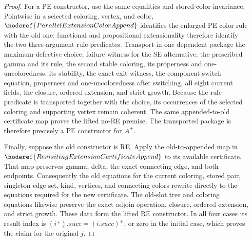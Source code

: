 \begin{proof}
For a PE constructor, use the same equalities and stored-color invariance.
Pointwise in a selected coloring, vertex, and color,
\(\noderef{ParallelExtensionColorAppend}\) identifies the enlarged PE color
rule with the old one; functional and propositional extensionality therefore
identify the two three-argument rule predicates.  Transport in one dependent
package the maximum-defective choice, failure witness for the SE alternative,
the prescribed gamma and its rule, the second stable coloring, its properness
and one-uncoloredness, its stability, the exact exit witness, the component
switch equation, properness and one-uncoloredness after switching, all eight
current fields, the closure, ordered extension, and strict growth.  Because
the rule predicate is transported together with the choice, its occurrences
of the selected coloring and supporting vertex remain coherent.  The same
appended-to-old certificate map proves the lifted no-RE premise.  The
transported package is therefore precisely a PE constructor for \(A^+\).

Finally, suppose the old constructor is RE.  Apply the old-to-appended map in
\(\noderef{RevisitingExtensionCertificateAppend}\) to its available
certificate.  That map preserves gamma, delta, the exact connecting edge,
and both endpoints.  Consequently the old equations for the current coloring,
stored pair, singleton edge set, kind, vertices, and connecting colors rewrite
directly to the equations required for the new certificate.  The old-slot
tree and coloring equations likewise preserve the exact adjoin operation,
closure, ordered extension, and strict growth.  These data form the lifted RE
constructor.  In all four cases its result index is
\((i^+).succ=(i.succ)^+\), or zero in the initial case, which proves the
claim for the original \(j\).
\end{proof}
